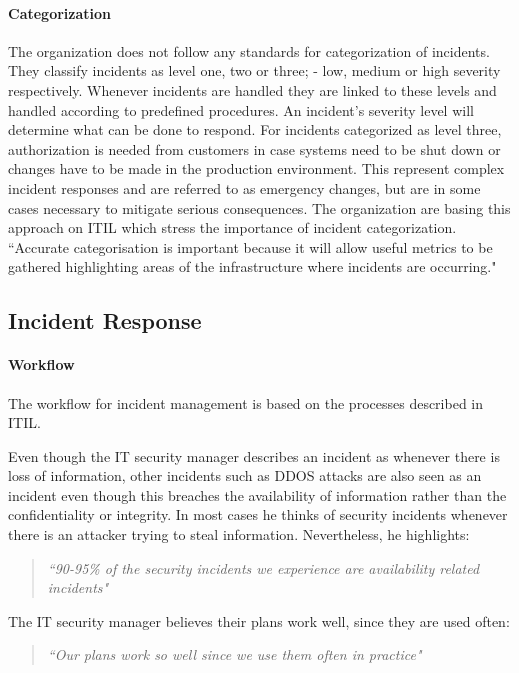 \paragraph{Categorization}
The organization does not follow any standards for categorization of incidents. They classify incidents as level one, two or three; - low, medium or high severity respectively. Whenever incidents are handled they are linked to these levels and handled according to predefined procedures. An incident's severity level will determine what can be done to respond. For incidents categorized as level three, authorization is needed from customers in case systems need to be shut down or changes have to be made in the production environment. This represent complex incident responses and are referred to as emergency changes, but are in some cases necessary to mitigate serious consequences. The organization are basing this approach on ITIL which stress the importance of incident categorization. ``Accurate categorisation is important because it will allow useful metrics to be gathered highlighting areas of the infrastructure where incidents are occurring\cite{itilbok}."

\subsection{Incident Response}
\paragraph{Workflow}
The workflow for incident management is based on the processes described in ITIL.

Even though the IT security manager describes an incident as whenever there is loss of information, other incidents such as DDOS attacks are also seen as an incident even though this breaches the availability of information rather than the confidentiality or integrity. In most cases he thinks of security incidents whenever there is an attacker trying to steal information. Nevertheless, he highlights:
\begin{quote}
\textit{``90-95\% of the security incidents we experience are availability related incidents"}
\end{quote}

The IT security manager believes their plans work well, since they are used often:
\begin{quote}
\textit{``Our plans work so well since we use them often in practice"}
\end{quote}

